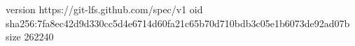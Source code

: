 version https://git-lfs.github.com/spec/v1
oid sha256:7fa8ec42d9d330cc5d4e6714d60fa21c65b70d710bdb3c05e1b6073de92ad07b
size 262240
